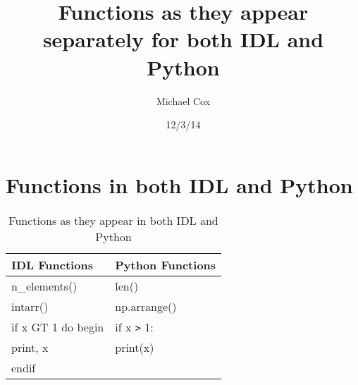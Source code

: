 \documentclass[12pt]{article}
\title{Functions as they appear separately for both IDL and Python}
\author{Michael Cox}
\date{12/3/14}
\begin{document}

\maketitle

\section{Functions in both IDL and Python}

\begin{table}[h!]
  \centering
   \begin{tabular}{| l | l |}
    \hline
    \textbf{IDL Functions} & \textbf{Python Functions} \\ \hline
    n\_elements() & len() \\ \hline
    intarr() & np.arrange() \\ \hline
    if x GT 1 do begin & if x \verb!>! 1: \\
    \hspace{4 mm}print, x & \hspace{4 mm}print(x) \\
    endif & \\ \hline
   \end{tabular}
   \caption{Functions as they appear in both IDL and Python}
\end{table}
\end{document}
